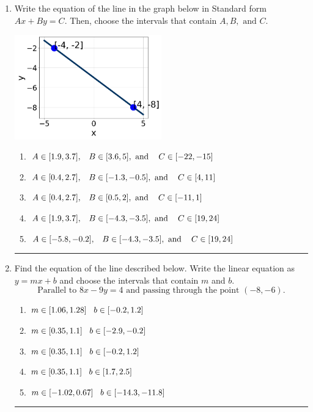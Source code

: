 \documentclass[14pt]{extbook}
\newcommand{\litem}[1]{\item#1\hspace*{-1cm}\rule{\textwidth}{0.4pt}}
\begin{document}
\begin{enumerate}
{\begin{enumerate}[label=\Alph*.]
\end{enumerate} }
\litem{
Write the equation of the line in the graph below in Standard form $Ax+By=C$. Then, choose the intervals that contain $A, B, \text{ and } C$.
\begin{center}
    \includegraphics[width=0.5\textwidth]{../Figures/linearGraphToStandardCopyC.png}
\end{center}
\begin{enumerate}[label=\Alph*.]
\item \( A \in [1.9, 3.7], \hspace{3mm} B \in [3.6, 5], \text{ and } \hspace{3mm} C \in [-22, -15] \)
\item \( A \in [0.4, 2.7], \hspace{3mm} B \in [-1.3, -0.5], \text{ and } \hspace{3mm} C \in [4, 11] \)
\item \( A \in [0.4, 2.7], \hspace{3mm} B \in [0.5, 2], \text{ and } \hspace{3mm} C \in [-11, 1] \)
\item \( A \in [1.9, 3.7], \hspace{3mm} B \in [-4.3, -3.5], \text{ and } \hspace{3mm} C \in [19, 24] \)
\item \( A \in [-5.8, -0.2], \hspace{3mm} B \in [-4.3, -3.5], \text{ and } \hspace{3mm} C \in [19, 24] \)

\end{enumerate} }
\litem{
Find the equation of the line described below. Write the linear equation as $ y=mx+b $ and choose the intervals that contain $m$ and $b$.\[ \text{Parallel to } 8 x - 9 y = 4 \text{ and passing through the point } (-8, -6). \]\begin{enumerate}[label=\Alph*.]
\item \( m \in [1.06, 1.28] \hspace*{3mm} b \in [-0.2, 1.2] \)
\item \( m \in [0.35, 1.1] \hspace*{3mm} b \in [-2.9, -0.2] \)
\item \( m \in [0.35, 1.1] \hspace*{3mm} b \in [-0.2, 1.2] \)
\item \( m \in [0.35, 1.1] \hspace*{3mm} b \in [1.7, 2.5] \)
\item \( m \in [-1.02, 0.67] \hspace*{3mm} b \in [-14.3, -11.8] \)


\end{enumerate}}
\end{enumerate}
\end{document}
